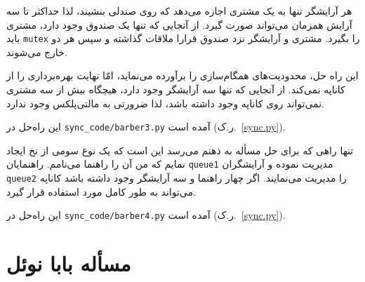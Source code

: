 \documentclass{book}
\newcommand{\clearemptydoublepage}{\newpage\cleardoublepage}
\begin{document}
    هر آرایشگر تنها به یک مشتری اجازه می‌دهد که روی صندلی بنشیند، لذا حداکثر تا سه آرایش همزمان می‌تواند صورت گیرد. از آنجایی که تنها یک صندوق وجود 
    دارد، مشتری باید  {\tt mutex} را بگیرد. مشتری و آرایشگر نزد صندوق قرارا ملاقات گذاشته و سپس هر دو خارج می‌شوند. 

    این راه حل،‌ محدودیت‌های همگام‌سازی را برآورده می‌نماید،‌ امّا نهایت بهره‌برداری را از کاناپه نمی‌کند. 
    از آنجایی که تنها سه آرایشگر وجود دارد، هیچگاه بیش از سه مشتری نمی‌تواند روی کاناپه وجود داشته باشد، لذا ضرورتی به مالتی‌پلکس وجود ندارد. 

    این راه‌حل در \verb"sync_code/barber3.py" آمده است (ر.ک.~\ref{sync.py}).


    تنها راهی که برای حل مسأله به ذهنم می‌رسد این است که یک نوع سومی از نخ ایجاد نمایم که من آن را راهنما می‌نامم. 
    راهنمایان {\tt queue1} مدیریت نموده و آرایشگران {\tt queue2} را مدیریت می‌نمایند. اگر چهار راهنما و سه آرایشگر وجود داشته باشد 
    کاناپه می‌تواند به طور کامل مورد استفاده قرار گیرد. 

    این راه‌حل در \verb"sync_code/barber4.py" آمده است (ر.ک.~\ref{sync.py}).


\clearemptydoublepage
\section{مسأله بابا نوئل}
\end{document}

